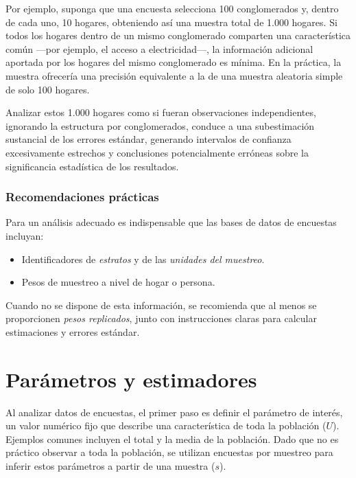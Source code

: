 \documentclass[
  spanish,
  12pt,
]{book}
\providecommand{\tightlist}{%
  \setlength{\itemsep}{0pt}\setlength{\parskip}{0pt}}
\begin{document}
Por ejemplo, suponga que una encuesta selecciona 100 conglomerados y, dentro de cada uno, 10 hogares, obteniendo así una muestra total de 1.000 hogares. Si todos los hogares dentro de un mismo conglomerado comparten una característica común ---por ejemplo, el acceso a electricidad---, la información adicional aportada por los hogares del mismo conglomerado es mínima. En la práctica, la muestra ofrecería una precisión equivalente a la de una muestra aleatoria simple de solo 100 hogares.

Analizar estos 1.000 hogares como si fueran observaciones independientes, ignorando la estructura por conglomerados, conduce a una subestimación sustancial de los errores estándar, generando intervalos de confianza excesivamente estrechos y conclusiones potencialmente erróneas sobre la significancia estadística de los resultados.

\subsubsection{Recomendaciones prácticas}\label{recomendaciones-pruxe1cticas}

Para un análisis adecuado es indispensable que las bases de datos de encuestas incluyan:

\begin{itemize}
\tightlist
\item
  Identificadores de \emph{estratos} y de las \emph{unidades del muestreo}.
\item
  Pesos de muestreo a nivel de hogar o persona.
\end{itemize}

Cuando no se dispone de esta información, se recomienda que al menos se proporcionen \emph{pesos replicados}, junto con instrucciones claras para calcular estimaciones y errores estándar.

\section{Parámetros y estimadores}\label{paruxe1metros-y-estimadores}

Al analizar datos de encuestas, el primer paso es definir el parámetro de interés, un valor numérico fijo que describe una característica de toda la población (\(U\)). Ejemplos comunes incluyen el total y la media de la población. Dado que no es práctico observar a toda la población, se utilizan encuestas por muestreo para inferir estos parámetros a partir de una muestra (\(s\)).
\end{document}
